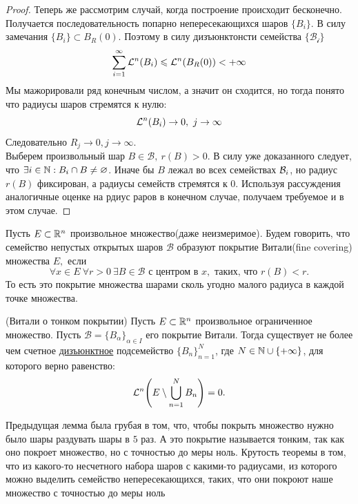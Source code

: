 \begin{proof}
    Теперь же рассмотрим случай, когда построение происходит бесконечно. Получается последовательность попарно непересекающихся шаров $\{B_i\}.$ В силу замечания $\{B_i\} \subset B_{R}(0)$. Поэтому в силу дизъюнктонсти семейства $\{\mathcal{B_i}\}$
    $$\sum_{i = 1}^{\infty} \mathcal{L}^n(B_i) \leqslant \mathcal{L}^n(B_{R}(0)) < +\infty$$
    Мы мажорировали ряд конечным числом, а значит он сходится, но тогда понято что радиусы шаров стремятся к нулю:
    $$\mathcal{L}^n(B_i) \rightarrow 0, \ j \rightarrow \infty$$
    Следовательно $R_j \rightarrow 0, j\rightarrow \infty$. \\
    Выберем произвольный шар $B \in \mathcal{B}, \ r(B) > 0.$ В силу уже доказанного следует, что $\exists i \in \mathbb{N} : B_i \cap B \neq \varnothing$. Иначе бы $B$ лежал во всех семействах  $\mathcal{B}_i$, но радиус $r(B)$ фиксирован, а радиусы семейств стремятся к $0$. Используя рассуждения аналогичные оценке на рдиус раров в конечном случае, получаем требуемое и в этом случае.
\end{proof}

\begin{definition}
    Пусть $E \subset \mathbb{R}^n$ произвольное множество(даже неизмеримое). Будем говорить, что семейство непустых открытых шаров $\mathcal{B}$ образуют покрытие Витали(fine covering) множества $E,$ если 
    $$\forall x \in E \ \forall r > 0 \ \exists B \in \mathcal{B} \text{ с центром в } x, \text{ таких, что } r(B) < r.$$
    То есть это покрытие множества шарами сколь угодно малого радиуса в каждой точке множества.
\end{definition}

\begin{theorem}
    (Витали о тонком покрытии) Пусть $E \subset \mathbb{R}^n$ произвольное ограниченное множество. Пусть $\mathcal{B} = \{B_{\alpha}\}_{\alpha \in I}$ его покрытие Витали. Тогда существует не более чем счетное \underline{дизъюнктное} подсемейство $\{B_n\}_{n = 1}^N$, где $N \in \mathbb{N} \cup \{+\infty\}$, для которого верно равенство:
    $$\mathcal{L}^n\Bigg(E \setminus \bigcup_{n = 1}^{N} B_n \Bigg) = 0.$$
\end{theorem}
\remark Предыдущая лемма была грубая в том, что, чтобы покрыть множество нужно было шары раздувать шары в $5$ раз. А это покрытие называется тонким, так как оно покроет множество, но с точностью до меры ноль. Крутость теоремы в том, что из какого-то несчетного набора шаров с какими-то радиусами, из которого можно выделить семейство непересекающихся, таких, что они покроют наше множество с точностью до меры ноль

